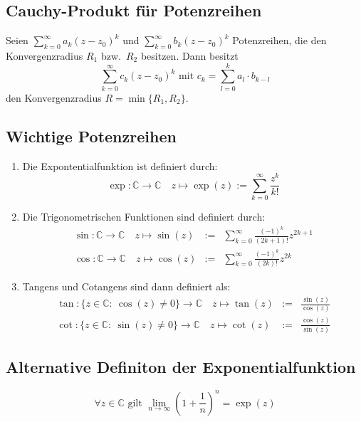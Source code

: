 \documentclass[10pt]{article}
\newcommand{\C}{\mathbb{C}}
\begin{document}
    \subsection{Cauchy-Produkt für Potenzreihen}
    Seien $\sum_{k=0}^\infty a_k {(z-z_0)}^k$ und
    $\sum_{k=0}^\infty b_k {(z-z_0)}^k$ Potenzreihen, die den Konvergenzradius
    $R_1$ bzw.\ $R_2$ besitzen. Dann besitzt
    \begin{equation*}
            \sum_{k=0}^\infty c_k {(z-z_0)}^k \text{ mit }
            c_k = \sum_{l=0}^k a_l \cdot b_{k-l}
    \end{equation*}
    den Konvergenzradius $R = \min \{R_1, R_2\}$.

    \subsection{Wichtige Potenzreihen}
    \begin{enumerate}[label= (\alph*)]
        \item Die Expontentialfunktion ist definiert durch:
            \begin{equation*}
                \exp: \C \rightarrow \C\quad z \mapsto \exp(z) :=
                \sum_{k=0}^\infty \frac{z^k}{k!}
            \end{equation*}
        \item Die Trigonometrischen Funktionen sind definiert durch:
            \begin{eqnarray*}
                \sin: \C \rightarrow \C\quad z \mapsto \sin(z) &:=&
                \sum_{k=0}^\infty \frac{{(-1)}^k}{(2k+1)!}z^{2k+1}\\
                \cos: \C \rightarrow \C\quad z \mapsto \cos(z) &:=&
                \sum_{k=0}^\infty \frac{{(-1)}^k}{(2k)!}z^{2k}
            \end{eqnarray*}
        \item Tangens und Cotangens sind dann definiert als:
            \begin{eqnarray*}
                \tan: \{z \in \C:\ \cos(z) \neq 0 \} \rightarrow \C\quad
                z \mapsto \tan(z)&:=&\frac{\sin(z)}{\cos(z)}\\
                \cot: \{z \in \C:\ \sin(z) \neq 0 \} \rightarrow \C\quad
                z \mapsto \cot(z)&:=&\frac{\cos(z)}{\sin(z)}
            \end{eqnarray*}
    \end{enumerate}

    \subsection{Alternative Definiton der Exponentialfunktion}
    \begin{equation*}
        \forall z \in \C \text{ gilt }
        \lim_{n \rightarrow \infty} {\left(1 + \frac{1}{n}\right)}^n = \exp{(z)}
    \end{equation*}
\end{document}
